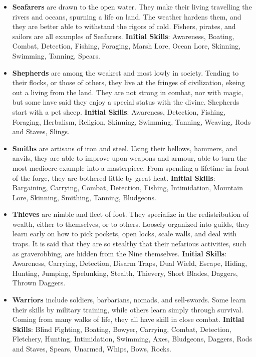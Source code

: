 \begin{itemize}
\item {\bf Seafarers} are drawn to the open water.  They make their living 
travelling the rivers and oceans, spurning a life on land.  The weather 
hardens them, and they are better able to withstand the rigors of cold.  
Fishers, pirates, and sailors are all examples of Seafarers.
\textbf{Initial Skills}: Awareness, Boating, Combat, Detection, Fishing,
Foraging, Marsh Lore, Ocean Lore, Skinning, Swimming, Tanning, Spears.

\item {\bf Shepherds} are among the weakest and most lowly in society.  
Tending to their flocks, or those of others, they live at the fringes of 
civilization, ekeing out a living from the land.  They are not strong in 
combat, nor with magic, but some have said they enjoy a special status 
with the divine.  Shepherds start with a pet sheep.  \textbf{Initial Skills}: 
Awareness, Detection, Fishing, Foraging, Herbalism, Religion, Skinning, 
Swimming, Tanning, Weaving, Rods and Staves, Slings.

\item {\bf Smiths} are artisans of iron and steel.  Using their bellows, 
hammers, and anvils, they are able to improve upon weapons and armour, 
able to turn the most mediocre example into a masterpiece.  From spending 
a lifetime in front of the forge, they are bothered little by great heat.
\textbf{Initial Skills}: Bargaining, Carrying, Combat, Detection, 
Fishing, Intimidation, Mountain Lore, Skinning, Smithing, Tanning,
Bludgeons.

\item {\bf Thieves} are nimble and fleet of foot.  They specialize in the 
redistribution of wealth, either to themselves, or to others.  Loosely 
organized into guilds, they learn early on how to pick pockets, open 
locks, scale walls, and deal with traps.  It is said that they are so
stealthy that their nefarious activities, such as graverobbing, are hidden
from the Nine themselves.  \textbf{Initial Skills}: Awareness, Carrying, 
Detection, Disarm Traps, Dual Wield, Escape, Hiding, Hunting, Jumping, 
Spelunking, Stealth, Thievery, Short Blades, Daggers, Thrown Daggers.

\item {\bf Warriors} include soldiers, barbarians, nomads, and sell-swords.
Some learn their skills by military training, while others learn simply 
through survival.  Coming from many walks of life, they all have skill in 
close combat.  \textbf{Initial Skills}: Blind Fighting, Boating, Bowyer,
Carrying, Combat, Detection, Fletchery, Hunting, Intimidation, Swimming,
Axes, Bludgeons, Daggers, Rods and Staves, Spears, Unarmed, Whips, Bows,
Rocks.


\end{itemize}

